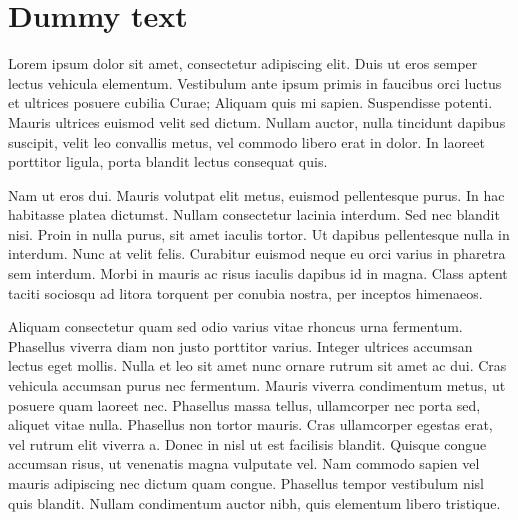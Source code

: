 \documentclass{chi-ext}
\begin{document}
\section{Dummy text}
Lorem ipsum dolor sit amet, consectetur adipiscing elit. Duis ut eros semper lectus vehicula elementum. Vestibulum ante ipsum primis in faucibus orci luctus et ultrices posuere cubilia Curae; Aliquam quis mi sapien. Suspendisse potenti. Mauris ultrices euismod velit sed dictum. Nullam auctor, nulla tincidunt dapibus suscipit, velit leo convallis metus, vel commodo libero erat in dolor. In laoreet porttitor ligula, porta blandit lectus consequat quis. 

Nam ut eros dui. Mauris volutpat elit metus, euismod pellentesque purus. In hac habitasse platea dictumst. Nullam consectetur lacinia interdum. Sed nec blandit nisi. Proin in nulla purus, sit amet iaculis tortor. Ut dapibus pellentesque nulla in interdum. Nunc at velit felis. Curabitur euismod neque eu orci varius in pharetra sem interdum. Morbi in mauris ac risus iaculis dapibus id in magna. Class aptent taciti sociosqu ad litora torquent per conubia nostra, per inceptos himenaeos.

Aliquam consectetur quam sed odio varius vitae rhoncus urna fermentum. Phasellus viverra diam non justo porttitor varius. Integer ultrices accumsan lectus eget mollis. Nulla et leo sit amet nunc ornare rutrum sit amet ac dui. Cras vehicula accumsan purus nec fermentum. Mauris viverra condimentum metus, ut posuere quam laoreet nec. Phasellus massa tellus, ullamcorper nec porta sed, aliquet vitae nulla. Phasellus non tortor mauris. Cras ullamcorper egestas erat, vel rutrum elit viverra a. Donec in nisl ut est facilisis blandit. Quisque congue accumsan risus, ut venenatis magna vulputate vel. Nam commodo sapien vel mauris adipiscing nec dictum quam congue. Phasellus tempor vestibulum nisl quis blandit. Nullam condimentum auctor nibh, quis elementum libero tristique.
\end{document}
